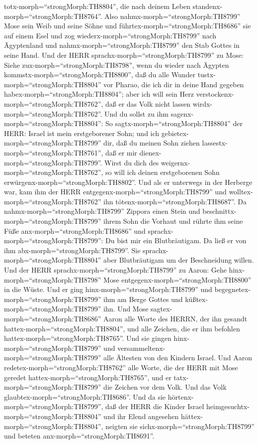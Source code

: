 totx-morph=``strongMorph:TH8804'', die nach deinem Leben
standenx-morph=``strongMorph:TH8764''.  Also
nahmx-morph=``strongMorph:TH8799'' Mose sein Weib und seine Söhne und
führtex-morph=``strongMorph:TH8686'' sie auf einem Esel und zog
wiederx-morph=``strongMorph:TH8799'' nach Ägyptenland und
nahmx-morph=``strongMorph:TH8799'' den Stab Gottes in seine Hand.
 Und der HERR sprachx-morph=``strongMorph:TH8799'' zu Mose:
Siehe zux-morph=``strongMorph:TH8798'', wenn du wieder nach Ägypten
kommstx-morph=``strongMorph:TH8800'', daß du alle Wunder
tustx-morph=``strongMorph:TH8804'' vor Pharao, die ich dir in deine Hand
gegeben habex-morph=``strongMorph:TH8804''; aber ich will sein Herz
verstockenx-morph=``strongMorph:TH8762'', daß er das Volk nicht lassen
wirdx-morph=``strongMorph:TH8762''.  Und du sollst zu ihm
sagenx-morph=``strongMorph:TH8804'': So
sagtx-morph=``strongMorph:TH8804'' der HERR: Israel ist mein
erstgeborener Sohn;  und ich
gebietex-morph=``strongMorph:TH8799'' dir, daß du meinen Sohn ziehen
lassestx-morph=``strongMorph:TH8761'', daß er mir
dienex-morph=``strongMorph:TH8799''. Wirst du dich des
weigernx-morph=``strongMorph:TH8762'', so will ich deinen erstgeborenen
Sohn erwürgenx-morph=``strongMorph:TH8802''.  Und als er
unterwegs in der Herberge war, kam ihm der HERR
entgegenx-morph=``strongMorph:TH8799'' und
wolltex-morph=``strongMorph:TH8762'' ihn
tötenx-morph=``strongMorph:TH8687''.  Da
nahmx-morph=``strongMorph:TH8799'' Zippora einen Stein und
beschnittx-morph=``strongMorph:TH8799'' ihrem Sohn die Vorhaut und
rührte ihm seine Füße anx-morph=``strongMorph:TH8686'' und
sprachx-morph=``strongMorph:TH8799'': Du bist mir ein Blutbräutigam.
 Da ließ er von ihm abx-morph=``strongMorph:TH8799''. Sie
sprachx-morph=``strongMorph:TH8804'' aber Blutbräutigam um der
Beschneidung willen.  Und der HERR
sprachx-morph=``strongMorph:TH8799'' zu Aaron: Gehe
hinx-morph=``strongMorph:TH8798'' Mose
entgegenx-morph=``strongMorph:TH8800'' in die Wüste. Und er ging
hinx-morph=``strongMorph:TH8799'' und
begegnetex-morph=``strongMorph:TH8799'' ihm am Berge Gottes und
küßtex-morph=``strongMorph:TH8799'' ihn.  Und Mose
sagtex-morph=``strongMorph:TH8686'' Aaron alle Worte des HERRN, der ihn
gesandt hattex-morph=``strongMorph:TH8804'', und alle Zeichen, die er
ihm befohlen hattex-morph=``strongMorph:TH8765''.  Und sie
gingen hinx-morph=``strongMorph:TH8799'' und
versammeltenx-morph=``strongMorph:TH8799'' alle Ältesten von den Kindern
Israel.  Und Aaron redetex-morph=``strongMorph:TH8762''
alle Worte, die der HERR mit Mose geredet
hattex-morph=``strongMorph:TH8765'', und er
tatx-morph=``strongMorph:TH8799'' die Zeichen vor dem Volk.
 Und das Volk glaubtex-morph=``strongMorph:TH8686''. Und da
sie hörtenx-morph=``strongMorph:TH8799'', daß der HERR die Kinder Israel
heimgesuchtx-morph=``strongMorph:TH8804'' und ihr Elend angesehen
hättex-morph=``strongMorph:TH8804'', neigten sie
sichx-morph=``strongMorph:TH8799'' und beteten
anx-morph=``strongMorph:TH8691''.

